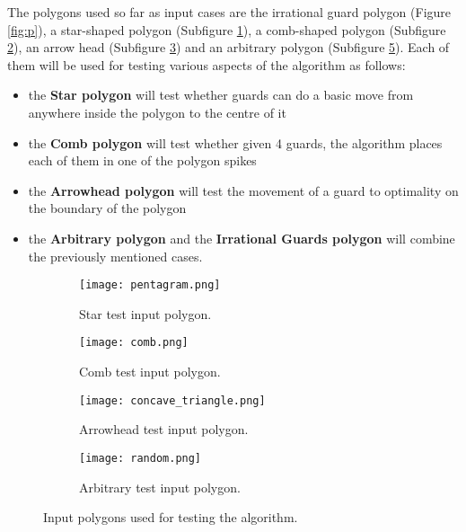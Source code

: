 The polygons used so far as input cases are the irrational guard polygon (Figure \ref{fig:p}), a star-shaped polygon (Subfigure \ref{fig:star}), a comb-shaped polygon (Subfigure \ref{fig:comb}), an arrow head (Subfigure \ref{fig:concave}) and an arbitrary polygon (Subfigure \ref{fig:random}). Each of them will be used for testing various aspects of the algorithm as follows:

\begin{itemize}
    \item the \textbf{Star polygon} will test whether guards can do a basic move from anywhere inside the polygon to the centre of it
    \item the \textbf{Comb polygon} will test whether given 4 guards, the algorithm places each of them in one of the polygon spikes
    \item the \textbf{Arrowhead polygon} will test the movement of a guard to optimality on the boundary of the polygon
    \item the \textbf{Arbitrary polygon} and the \textbf{Irrational Guards polygon} will combine the previously mentioned cases.
\end{itemize}

\begin{figure}
    \centering
    \begin{subfigure}{0.45\textwidth}
        \centering
        \texttt{[image: pentagram.png]}
        \caption{Star test input polygon.}
        \label{fig:star}
    \end{subfigure}
    \begin{subfigure}{0.45\textwidth}
        \centering
        \texttt{[image: comb.png]}
        \caption{Comb test input polygon.}
        \label{fig:comb}
    \end{subfigure}
    \begin{subfigure}{0.45\textwidth}
        \centering
        \texttt{[image: concave\_triangle.png]}
        \caption{Arrowhead test input polygon.}
        \label{fig:concave}
    \end{subfigure}
    \begin{subfigure}{0.45\textwidth}
        \centering
        \texttt{[image: random.png]}
        \caption{Arbitrary test input polygon.}
        \label{fig:random}
    \end{subfigure}
    \caption{Input polygons used for testing the algorithm.}
\end{figure}

